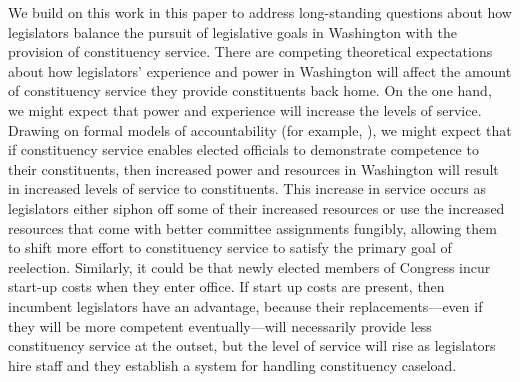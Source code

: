 \documentclass{article}
\begin{document}
We build on this work in this paper to address long-standing questions about how legislators balance the pursuit of legislative goals in Washington with the provision of constituency service.  There are competing theoretical expectations about how legislators' experience and power in Washington will affect the amount of constituency service they provide constituents back home.  On the one hand, we might expect that power and experience will increase the levels of service.  Drawing on formal models of accountability (for example, \cite{AshworthBuenodeMesquita2006}), we might expect that if constituency service enables elected officials to demonstrate competence to their constituents, then increased power and resources in Washington will result in increased levels of service to constituents.  This increase in service occurs as legislators either siphon off some of their increased resources or use the increased resources that come with better committee assignments fungibly,  allowing them to shift more effort to constituency service to satisfy the primary goal of reelection.  Similarly, it could be that newly elected members of Congress incur start-up costs when they enter office.  If start up costs are present, then incumbent legislators have an advantage, because their replacements---even if they will be more competent eventually---will necessarily provide less constituency service at the outset, but the level of service will rise as legislators hire staff and they establish a system for handling constituency caseload.  


\end{document}

